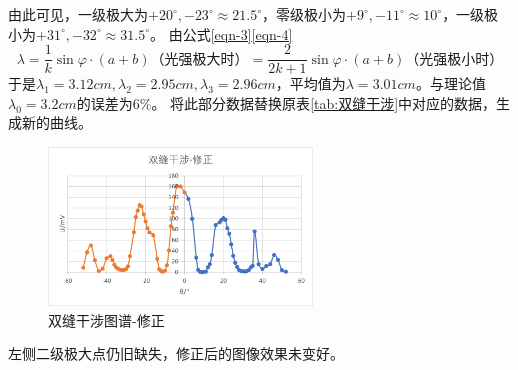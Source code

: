\documentclass[11pt]{article}
\begin{document}
    由此可见，一级极大为$+20^\circ, -23^\circ\approx 21.5^\circ$，零级极小为$+9^\circ, -11^\circ\approx 10^\circ$，一级极小为$+31^\circ, -32^\circ\approx 31.5^\circ$。
    由公式\eqref{eqn-3}\eqref{eqn-4}
    \begin{equation}
        \lambda=\frac{1}{k}\sin\varphi \cdot\left(a+b\right)\text{（光强极大时）}=\frac{2}{2k+1}\sin\varphi \cdot \left(a+b\right)\text{（光强极小时）}
    \end{equation}
    \hspace*{2em}于是$\lambda_1=3.12cm,\lambda_2=2.95cm,\lambda_3=2.96cm$，平均值为$\lambda=3.01cm$。与理论值$\lambda_0=3.2cm$的误差为$6\%$。
    \newline \hspace*{2em}将此部分数据替换原表\ref{tab:双缝干涉}中对应的数据，生成新的曲线。
    \begin{figure}[H]
        \centering
        \includegraphics[width=7cm]{Fig/6.png}
        \caption{双缝干涉图谱-修正}
    \end{figure}
    左侧二级极大点仍旧缺失，修正后的图像效果未变好。
\end{document}

